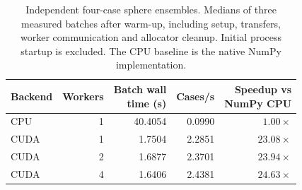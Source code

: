 \begin{table}[tbp]
\centering
\small
\renewcommand{\arraystretch}{1.15}
\caption{Independent four-case sphere ensembles. Medians of three measured batches after warm-up, including setup, transfers, worker communication and allocator cleanup. Initial process startup is excluded. The CPU baseline is the native NumPy implementation.}
\label{tab:batch}
\begin{tabular}{@{}lrrrr@{}}
\toprule
Backend & Workers & \shortstack{Batch wall\\time (s)} & Cases/s & \shortstack{Speedup vs\\NumPy CPU} \\
\midrule
CPU & 1 & 40.4054 & 0.0990 & $1.00\times$ \\
CUDA & 1 & 1.7504 & 2.2851 & $23.08\times$ \\
CUDA & 2 & 1.6877 & 2.3701 & $23.94\times$ \\
CUDA & 4 & 1.6406 & 2.4381 & $24.63\times$ \\
\bottomrule
\end{tabular}
\end{table}
